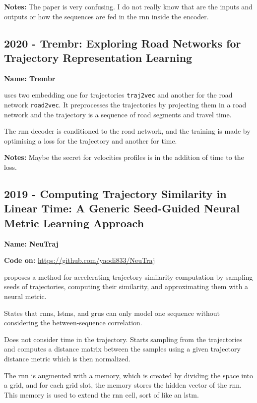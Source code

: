 \textbf{Notes:} The paper is very confusing. I do not really know that are the inputs and outputs or how the sequences are fed in the \gls{rnn} inside the encoder.


\subsection*{2020 - Trembr: Exploring Road Networks for Trajectory Representation Learning}

\textbf{Name: Trembr}

\cite{fu2020trembr} uses two embedding one for trajectories \texttt{traj2vec} and another for the road network \texttt{road2vec}. It preprocesses the trajectories by projecting them in a road network and the trajectory is a sequence of road segments and travel time.

The \gls{rnn} decoder is conditioned to the road network, and the training is made by optimising a loss for the trajectory and another for time.

\textbf{Notes:} Maybe the secret for velocities profiles is in the addition of time to the loss.

\subsection*{2019 - Computing Trajectory Similarity in Linear Time: A Generic Seed-Guided Neural Metric Learning Approach}

\textbf{Name: NeuTraj}

\textbf{Code on:} \url{https://github.com/yaodi833/NeuTraj}

\cite{yao2019computing} proposes a method for accelerating trajectory similarity computation by sampling seeds of trajectories, computing their similarity, and approximating them with a neural metric.

States that \glspl{rnn}, \glspl{lstm}, and \glspl{gru} can only  model one sequence without considering the between-sequence correlation.

Does not consider time in the trajectory. Starts sampling from the trajectories and computes a distance matrix between the samples using a given trajectory distance metric which is then normalized.

The \gls{rnn} is augmented with a memory, which is created by dividing the space into a grid, and for each grid slot, the memory stores the hidden vector of the \gls{rnn}. This memory is used to extend the \gls{rnn} cell, sort of like an \gls{lstm}.

